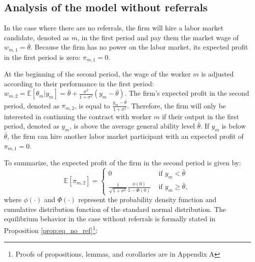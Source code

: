 \documentclass[12pt]{article}
\begin{document}
\subsection{Analysis of the model without referrals}

In the case where there are no referrals, the firm will hire a labor market candidate, denoted as $m$, in the first period and pay them the market wage of $w_{m,1} = \bar{\theta}$. Because the firm has no power on the labor market, its expected profit in the first period is zero: $\pi_{m,1} = 0$.

At the beginning of the second period, the wage of the worker $m$ is adjusted according to their performance in the first period: $w_{m,2} = \mathbb{E}[\theta_m|y_m] = \bar{\theta} + \frac{\sigma^2}{1+\sigma^2}(y_m-\bar{\theta})$. The firm's expected profit in the second period, denoted as $\pi_{m,2}$, is equal to $\frac{y_m-\bar{\theta}}{1+\sigma^2}$. Therefore, the firm will only be interested in continuing the contract with worker $m$ if their output in the first period, denoted as $y_m$, is above the average general ability level $\bar{\theta}$. If $y_m$ is below $\bar{\theta}$, the firm can hire another labor market participant with an expected profit of $\pi_{m,1}=0$.

To summarize, the expected profit of the firm in the second period is given by:
\begin{equation}
    \mathbb{E}[\pi_{m,2}]= 
    \begin{cases}
        0 & \text{ if } y_m < \bar{\theta}\\
        \frac{1}{\sqrt{1 + \sigma^2}}\frac{\phi(0)}{1-\Phi(0)} & \text{ if } y_m \geq \bar{\theta},
    \end{cases}
\end{equation}
where $\phi(\cdot)$ and $\Phi(\cdot)$ represent the probability density function and cumulative distribution function of the standard normal distribution. The equilibrium behavior in the case without referrals is formally stated in Proposition \ref{prop:eq_no_ref}\footnote{Proofs of propositions, lemmas, and corollaries are in Appendix A}:
\end{document}
